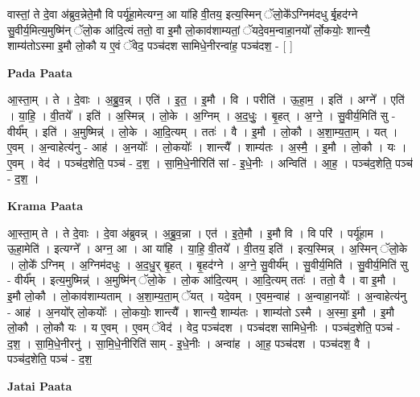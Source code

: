 \documentclass[17pt]{extarticle}
\begin{document}
वास्तां॒ ते दे॒वा अ॑ब्रुव॒न्नेते॒मौ वि पर्यू॑हा॒मेत्यग्न॒ आ या॑हि वी॒तय॒ इत्य॒स्मिन् ॅलो॒के᳚ऽग्निम॑दधु र्बृ॒हद॑ग्ने सु॒वीर्य॒मित्य॒मुष्मि॑न् ॅलो॒क आ॑दि॒त्यं ततो॒ वा इ॒मौ लो॒काव॑शाम्यतां॒ ॅयदे॒वम॒न्वाहा॒नयो᳚ र्लो॒कयोः॒ शान्त्यै॒ शाम्य॑तोऽस्मा इ॒मौ लो॒कौ य ए॒वं ॅवेद॒ पञ्च॑दश सामिधे॒नीरन्वा॑ह॒ पञ्च॑दश॒ - [  ] \newline

\textbf{Pada Paata} \newline

आ॒स्ता॒म् । ते । दे॒वाः । अ॒ब्रु॒व॒न्न् । एति॑ । इ॒त॒ । इ॒मौ । वि । परीति॑ । ऊ॒हा॒म॒ । इति॑ । अग्ने᳚ । एति॑ । या॒हि॒ । वी॒तये᳚ । इति॑ । अ॒स्मिन्न् । लो॒के । अ॒ग्निम् । अ॒द॒धुः॒ । बृ॒हत् । अ॒ग्ने॒ । सु॒वीर्य॒मिति॑ सु - वीर्य᳚म् । इति॑ । अ॒मुष्मिन्न्॑ । लो॒के । आ॒दि॒त्यम् । ततः॑ । वै । इ॒मौ । लो॒कौ । अ॒शा॒म्य॒ता॒म् । यत् । ए॒वम् । अ॒न्वाहेत्य॑नु - आह॑ । अ॒नयोः᳚ । लो॒कयोः᳚ । शान्त्यै᳚ । शाम्य॑तः । अ॒स्मै॒ । इ॒मौ । लो॒कौ । यः । ए॒वम् । वेद॑ । पञ्च॑द॒शेति॒ पञ्च॑ - द॒श॒ । सा॒मि॒धे॒नीरिति॑ सां - इ॒धे॒नीः । अन्विति॑ । आ॒ह॒ । पञ्च॑द॒शेति॒ पञ्च॑ - द॒श॒ ।  \newline


\textbf{Krama Paata} \newline

आ॒स्ता॒म् ते । ते दे॒वाः । दे॒वा अ॑ब्रुवन्न् । अ॒ब्रु॒व॒न्ना । एत॑ । इ॒ते॒मौ । इ॒मौ वि । वि परि॑ । पर्यू॑हाम । ऊ॒हा॒मेति॑ । इत्यग्ने᳚ । अग्न॒ आ । आ या॑हि । या॒हि॒ वी॒तये᳚ । वी॒तय॒ इति॑ । इत्य॒स्मिन्न् । अ॒स्मिन् ॅलो॒के । लो॒के᳚ ऽग्निम् । अ॒ग्निम॑दधुः । अ॒द॒धु॒र् बृ॒हत् । बृ॒हद॑ग्ने । अ॒ग्ने॒ सु॒वीर्य᳚म् । सु॒वीर्य॒मिति॑ । सु॒वीर्य॒मिति॑ सु - वीर्य᳚म् । इत्य॒मुष्मिन्न्॑ । अ॒मुष्मि॑न् ॅलो॒के । लो॒क आ॑दि॒त्यम् । आ॒दि॒त्यम् ततः॑ । ततो॒ वै । वा इ॒मौ । इ॒मौ लो॒कौ । लो॒काव॑शाम्यताम् । अ॒शा॒म्य॒ता॒म् ॅयत् । यदे॒वम् । ए॒वम॒न्वाह॑ । अ॒न्वाहा॒नयोः᳚ । अ॒न्वाहेत्य॑नु - आह॑ । अ॒नयो᳚र् लो॒कयोः᳚ । लो॒कयोः॒ शान्त्यै᳚ । शान्त्यै॒ शाम्य॑तः । शाम्य॑तो ऽस्मै । अ॒स्मा॒ इ॒मौ । इ॒मौ लो॒कौ । लो॒कौ यः । य ए॒वम् । ए॒वम् ॅवेद॑ । वेद॒ पञ्च॑दश । पञ्च॑दश सामिधे॒नीः । पञ्च॑द॒शेति॒ पञ्च॑ - द॒श॒ । सा॒मि॒धे॒नीरनु॑ । सा॒मि॒धे॒नीरिति॑ साम् - इ॒धे॒नीः । अन्वा॑ह । आ॒ह॒ पञ्च॑दश । पञ्च॑दश॒ वै । पञ्च॑द॒शेति॒ पञ्च॑ - द॒श॒ \newline

\textbf{Jatai Paata} \newline
\end{document}

